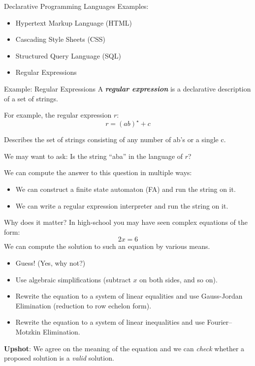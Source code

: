 \begin{frame}{Declarative Programming Languages}
Examples:

\begin{itemize}
    \item Hypertext Markup Language (HTML)
    \item Cascading Style Sheets (CSS)
    \item Structured Query Language (SQL)
    \item Regular Expressions
\end{itemize}
\end{frame}

\begin{frame}{Example: Regular Expressions}
A \textbf{\emph{regular expression}} is a declarative description of a set of strings.

For example, the regular expression $r$: 
%
$$
r = (ab)^\star + c
$$

Describes the set of strings consisting of any number of ab's or a single c.

\pause

We may want to ask: Is the string ``aba'' in the language of $r$?

We can compute the answer to this question in multiple ways:

\begin{itemize}
    \item We can construct a finite state automaton (FA) and run the string on it.
    \item We can write a regular expression interpreter and run the string on it.
\end{itemize}
\end{frame}

\begin{frame}{Why does it matter?}
In high-school you may have seen complex equations of the form:
\[
    2x = 6
\]
We can compute the solution to such an equation by various means.

\pause

\begin{itemize}
    \item Guess! (Yes, why not?) 
    \pause \item Use algebraic simplifications (subtract $x$ on both sides, and so on).
    \pause \item Rewrite the equation to a system of linear equalities and use
    Gauss-Jordan Elimination (reduction to row echelon form).
    \pause \item Rewrite the equation to a system of linear inequalities and use
    Fourier--Motzkin Elimination.
\end{itemize}

\pause

\textbf{Upshot}: We agree on the meaning of the equation and we can \emph{check}
whether a proposed solution is a \emph{valid} solution.
\end{frame}

